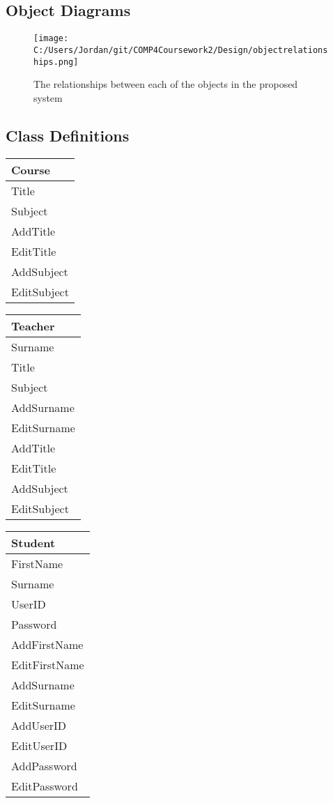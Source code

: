 \subsection{Object Diagrams}

\begin{figure}[H]
    \texttt{[image: C:/Users/Jordan/git/COMP4Coursework2/Design/objectrelationships.png]}
    \caption{The relationships between each of the objects in the proposed system} \label{fig:print_function_result}
\end{figure}

\subsection{Class Definitions}

\begin{center}
\begin{tabular}{|p{5cm}|} \hline
Course \\ \hline
Title \\
Subject \\ \hline
AddTitle \\ 
EditTitle \\
AddSubject \\
EditSubject \\ \hline
\end{tabular}
\end{center}

\begin{center}
\begin{tabular}{|p{5cm}|} \hline
Teacher \\ \hline
Surname \\
Title \\
Subject \\ \hline
AddSurname \\
EditSurname \\
AddTitle \\
EditTitle \\
AddSubject \\
EditSubject \\ \hline
\end{tabular}
\end{center}

\begin{center}
\begin{tabular}{|p{5cm}|} \hline
Student \\ \hline
FirstName \\
Surname \\
UserID \\
Password  \\ \hline
AddFirstName \\
EditFirstName \\
AddSurname \\
EditSurname \\
AddUserID \\
EditUserID \\
AddPassword \\
EditPassword \\ \hline
\end{tabular}
\end{center}

